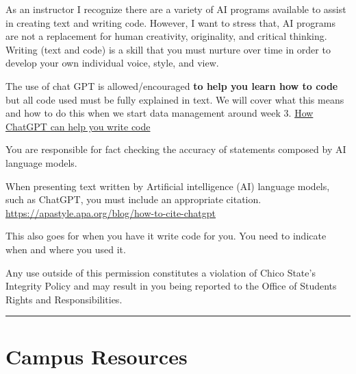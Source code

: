 \documentclass[
  letterpaper,
  DIV=11,
  numbers=noendperiod]{scrartcl}
\begin{document}
As an instructor I recognize there are a variety of AI programs
available to assist in creating text and writing code. However, I want
to stress that, AI programs are not a replacement for human creativity,
originality, and critical thinking. Writing (text and code) is a skill
that you must nurture over time in order to develop your own individual
voice, style, and view.

The use of chat GPT is allowed/encouraged \textbf{to help you learn how
to code} but all code used must be fully explained in text. We will
cover what this means and how to do this when we start data management
around week 3.
\href{https://www.zdnet.com/article/how-to-use-chatgpt-to-write-code/}{How
ChatGPT can help you write code}

You are responsible for fact checking the accuracy of statements
composed by AI language models.

\begin{tcolorbox}[enhanced jigsaw, opacitybacktitle=0.6, leftrule=.75mm, colframe=quarto-callout-important-color-frame, colbacktitle=quarto-callout-important-color!10!white, bottomtitle=1mm, breakable, rightrule=.15mm, colback=white, coltitle=black, arc=.35mm, left=2mm, titlerule=0mm, bottomrule=.15mm, title=\textcolor{quarto-callout-important-color}{\faExclamation}\hspace{0.5em}{Be up front!}, toprule=.15mm, toptitle=1mm, opacityback=0]

When presenting text written by Artificial intelligence (AI) language
models, such as ChatGPT, you must include an appropriate citation.
\url{https://apastyle.apa.org/blog/how-to-cite-chatgpt}

This also goes for when you have it write code for you. You need to
indicate when and where you used it.

\end{tcolorbox}

Any use outside of this permission constitutes a violation of Chico
State's Integrity Policy and may result in you being reported to the
Office of Students Rights and Responsibilities.

\begin{center}\rule{0.5\linewidth}{0.5pt}\end{center}

\hypertarget{campus-resources}{%
\section{Campus Resources}\label{campus-resources}}
\end{document}
